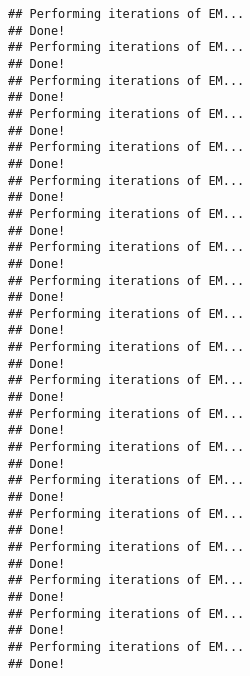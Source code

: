 \documentclass[]{article}
\newenvironment{Shaded}{\begin{snugshade}}{\end{snugshade}}
\newcommand{\CommentTok}[1]{\textcolor[rgb]{0.56,0.35,0.01}{\textit{#1}}}
\newcommand{\DecValTok}[1]{\textcolor[rgb]{0.00,0.00,0.81}{#1}}
\newcommand{\KeywordTok}[1]{\textcolor[rgb]{0.13,0.29,0.53}{\textbf{#1}}}
\newcommand{\NormalTok}[1]{#1}
\newcommand{\OperatorTok}[1]{\textcolor[rgb]{0.81,0.36,0.00}{\textbf{#1}}}
\newcommand{\StringTok}[1]{\textcolor[rgb]{0.31,0.60,0.02}{#1}}
\begin{document}
\begin{verbatim}
## Performing iterations of EM... 
## Done! 
## Performing iterations of EM... 
## Done! 
## Performing iterations of EM... 
## Done! 
## Performing iterations of EM... 
## Done! 
## Performing iterations of EM... 
## Done! 
## Performing iterations of EM... 
## Done! 
## Performing iterations of EM... 
## Done! 
## Performing iterations of EM... 
## Done! 
## Performing iterations of EM... 
## Done! 
## Performing iterations of EM... 
## Done! 
## Performing iterations of EM... 
## Done! 
## Performing iterations of EM... 
## Done! 
## Performing iterations of EM... 
## Done! 
## Performing iterations of EM... 
## Done! 
## Performing iterations of EM... 
## Done! 
## Performing iterations of EM... 
## Done! 
## Performing iterations of EM... 
## Done! 
## Performing iterations of EM... 
## Done! 
## Performing iterations of EM... 
## Done! 
## Performing iterations of EM... 
## Done!
\end{verbatim}

\begin{Shaded}
\end{Shaded}
\end{document}
